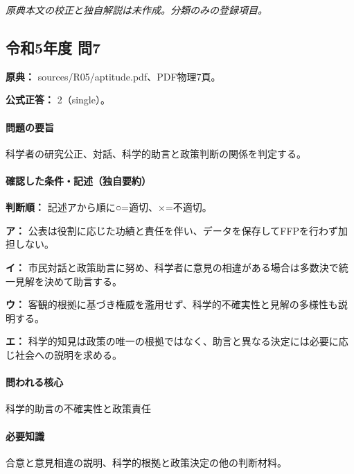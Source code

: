 \par\textit{原典本文の校正と独自解説は未作成。分類のみの登録項目。}

\subsection{令和5年度 問7}
\label{q:r05-reg-apt-07}

\noindent\textbf{原典：} sources/R05/aptitude.pdf、PDF物理7頁。

\textbf{公式正答：} 2（single）。

\paragraph{問題の要旨} 科学者の研究公正、対話、科学的助言と政策判断の関係を判定する。

\paragraph{確認した条件・記述（独自要約）}\mbox{}\par

\noindent\textbf{判断順：} 記述アから順に○=適切、×=不適切。\par

\noindent\textbf{ア：} 公表は役割に応じた功績と責任を伴い、データを保存してFFPを行わず加担しない。\par

\noindent\textbf{イ：} 市民対話と政策助言に努め、科学者に意見の相違がある場合は多数決で統一見解を決めて助言する。\par

\noindent\textbf{ウ：} 客観的根拠に基づき権威を濫用せず、科学的不確実性と見解の多様性も説明する。\par

\noindent\textbf{エ：} 科学的知見は政策の唯一の根拠ではなく、助言と異なる決定には必要に応じ社会への説明を求める。\par

\paragraph{問われる核心} 科学的助言の不確実性と政策責任

\paragraph{必要知識} 合意と意見相違の説明、科学的根拠と政策決定の他の判断材料。

